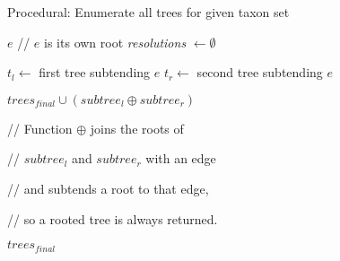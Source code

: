 \documentclass{article}
\begin{document}
\renewcommand{\algorithmiccomment}[1]{// #1}
\begin{algorithm}
\caption{Procedural: Enumerate all trees for given taxon set}\label{euclid}
\begin{algorithmic}[1]


		\Return $e$	\quad \algorithmiccomment{$e$ is its own root}
	\EndIf
    \State \textit{resolutions} $\gets \emptyset$
    
	\State $t_l \gets$ first tree subtending $e$
	\State $t_r \gets$ second tree subtending $e$

	
			
			\State $trees_{final} \cup (subtree_l \oplus subtree_r)$ 
			
			\quad \quad \quad \quad \quad \algorithmiccomment {Function $\oplus$ joins the roots of } 
																
			\quad \quad \quad \quad \quad \algorithmiccomment {$subtree_l$ and $subtree_r$ with an edge}
																	 
			\quad \quad \quad \quad \quad \algorithmiccomment {and subtends a root to that edge,}

			\quad \quad \quad \quad \quad \algorithmiccomment {so a rooted tree is always returned.}
		\EndFor
	\EndFor
\EndFor

\Return $trees_{final}$
\EndProcedure
\end{algorithmic}
\end{algorithm}
\end{document}
